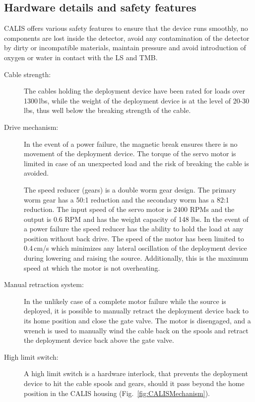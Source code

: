 \subsection{Hardware details and safety features}\label{sec:HardwareDetails}\label{sec:SafetyFeatures}
CALIS offers various safety features to ensure that the device runs smoothly, no components are lost inside the detector, avoid any contamination of the detector by dirty or incompatible materials, maintain pressure and avoid introduction of oxygen or water in contact with the LS and TMB. %

\begin{description}

\item[Cable strength:]
The cables holding the deployment device have been rated for loads over 1300\,lbs, while the weight of the deployment device is at the level of 20-30\,lbs, thus well below the breaking strength of the cable. 

\item[Drive mechanism:]
In the event of a power failure, the magnetic break ensures there is no movement of the deployment device. The torque of the servo motor is limited in case of an unexpected load and the risk of breaking the cable is avoided.

The speed reducer (gears) is a double worm gear design. The primary worm gear has a 50:1 reduction and the secondary worm has a 82:1 reduction. The input speed of the servo motor is 2400 RPMs and the output is 0.6 RPM and has the weight capacity of 148 lbs. In the event of a power failure the speed reducer has the ability to hold the load at any position without back drive. The speed of the motor has been limited to 0.4\,cm/s which minimizes any lateral oscillation of the deployment device during lowering and raising the source. Additionally, this is the maximum speed at which the motor is not overheating.

\item[Manual retraction system:]
In the unlikely case of a complete motor failure while the source is deployed, it is possible to manually retract the deployment device back to its home position and close the gate valve. The motor is disengaged, and a wrench is used to manually wind the cable back on the spools and retract the deployment device back above the gate valve. 
   
\item[High limit switch:]
A high limit switch is a hardware interlock, that prevents the deployment device to hit the cable spools and gears, should it pass beyond the home position in the CALIS housing (Fig.~\ref{fig:CALISMechanism}). 


\end{description}
